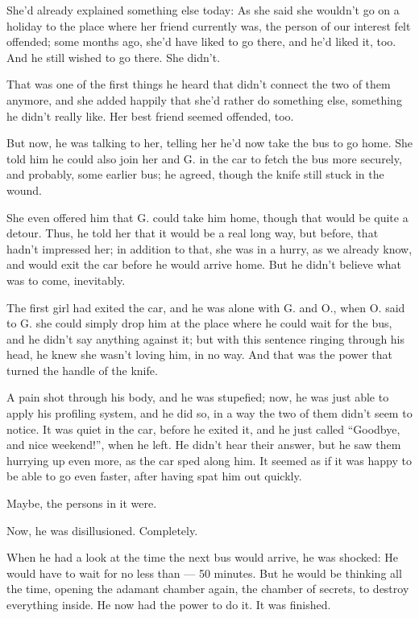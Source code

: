 She'd already explained something else today: As she said she wouldn't go on a holiday to the place where her friend currently was, the person of our interest felt offended; some months ago, she'd have liked to go there, and he'd liked it, too. 
And he still wished to go there. 
She didn't.

That was one of the first things he heard that didn't connect the two of them anymore, and she added happily that she'd rather do something else, something he didn't really like. 
Her best friend seemed offended, too.

But now, he was talking to her, telling her he'd now take the bus to go home. 
She told him he could also join her and G. in the car to fetch the bus more securely, and probably, some earlier bus; he agreed, though the knife still stuck in the wound. 

She even offered him that G. could take him home, though that would be quite a detour. 
Thus, he told her that it would be a real long way, but before, that hadn't impressed her; in addition to that, she was in a hurry, as we already know, and would exit the car before he would arrive home. 
But he didn't believe what was to come, inevitably.

The first girl had exited the car, and he was alone with G. and O., when O. said to G. she could simply drop him at the place where he could wait for the bus, and he didn't say anything against it; but with this sentence ringing through his head, he knew she wasn't loving him, in no way. 
And that was the power that turned the handle of the knife.

A pain shot through his body, and he was stupefied; now, he was just able to apply his profiling system, and he did so, in a way the two of them didn't seem to notice. 
It was quiet in the car, before he exited it, and he just called \enquote{Goodbye, and nice weekend!}, when he left. He didn't hear their answer, but he saw them hurrying up even more, as the car sped along him. 
It seemed as if it was happy to be able to go even faster, after having spat him out quickly.

Maybe, the persons in it were. 

Now, he was disillusioned. 
Completely. 

When he had a look at the time the next bus would arrive, he was shocked: He would have to wait for no less than --- 50 minutes. 
But he would be thinking all the time, opening the adamant chamber again, the chamber of secrets, to destroy everything inside. 
He now had the power to do it. 
It was finished.


